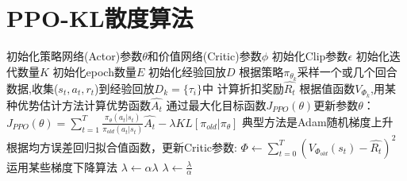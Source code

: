 \documentclass[11pt]{ctexart}
\begin{document}
\section{PPO-KL散度算法}
\begin{algorithm}[H] %
	\renewcommand{\thealgorithm}{} %
	\caption{} 
	\begin{algorithmic}[1] %
		\STATE 初始化策略网络(Actor)参数$\theta$和价值网络(Critic)参数$\phi$
		\STATE 初始化Clip参数$\epsilon$
		\STATE 初始化迭代数量$K$
		\STATE 初始化epoch数量$E$
		\STATE 初始化经验回放$D$
			\STATE 根据策略$\pi_{\theta_k}$采样一个或几个回合数据,收集($s_t,a_t,r_t$)到经验回放$D_k=\{\tau_i\}$中
				\STATE 计算折扣奖励$\hat{R_t}$
				\STATE 根据值函数$V_{\Phi_k}$,用某种优势估计方法计算优势函数$\hat{A_t}$
				\STATE 通过最大化目标函数$J_{PPO}(\theta)$更新参数$\theta$：
				\STATE $J_{PPO}(\theta)=\sum_{t=1}^{T}\frac{\pi_\theta(a_t|s_t)}{\pi_{old}(a_t|s_t)}\hat{A_t}-\lambda KL[\pi_{old}|\pi_\theta]$
				\STATE 典型方法是Adam随机梯度上升
				\STATE 根据均方误差回归拟合值函数，更新Critic参数:
				\STATE $\Phi \leftarrow \sum_{t=0}^{T} (V_{\Phi_{old}}(s_t)-\hat{R_t})^2$
				\STATE 运用某些梯度下降算法
					\STATE $\lambda \leftarrow \alpha\lambda$
					\STATE $\lambda \leftarrow \frac{\lambda}{\alpha}$
				\ENDIF
			\ENDFOR
		\ENDFOR
	\end{algorithmic}
\end{algorithm}

\clearpage
\end{document}
